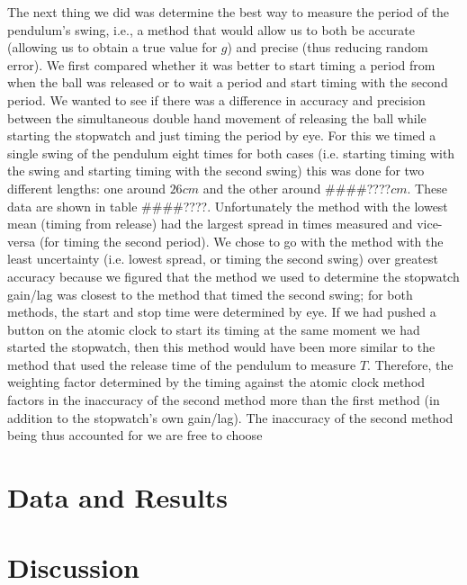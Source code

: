 \documentclass[iop]{emulateapj}
\def\g{$g$}
\def\T{$T$}
\def\fillin{\#\#\#\#????}
\begin{document}
The next thing we did was determine the best way to measure the period of the 
pendulum's swing, i.e., a method that would allow us to both be accurate 
(allowing us to obtain a true value for \g) and precise (thus reducing random 
error). We first compared whether it was better to start timing a period from 
when the ball was released or to wait a period and start timing with the 
second period.  We wanted to see if there was a difference in accuracy and 
precision between the simultaneous double hand movement of releasing the ball 
while starting the stopwatch and just timing the period by eye. For this we 
timed a single swing of the pendulum eight times for both cases (i.e. starting 
timing with the swing and starting timing with the second swing) this was done 
for two different lengths: one around $26cm$ and the other around \fillin$cm$. 
These data are shown in table \fillin. Unfortunately the method with the lowest 
mean (timing from release) had the largest spread in times measured and 
vice-versa (for timing the second period). We chose to go 
with the method with the least uncertainty (i.e. lowest spread, or timing the 
second swing) over greatest accuracy because we figured that the method we 
used to determine the stopwatch gain/lag was closest to the method that timed 
the second swing; for both methods, the start and stop time were determined by 
eye.  If we had pushed a button on the atomic clock to start its timing at the 
same moment we had started the stopwatch, then this method would have been 
more similar to the method that used the release time of the pendulum to 
measure \T.  Therefore, the weighting factor determined by the timing against 
the atomic clock method factors in the inaccuracy of the second method more 
than the first method (in addition to the stopwatch's own gain/lag). The 
inaccuracy of the second method being thus accounted for we are free to choose 






\section{Data and Results}
\label{sec:data}













\section{Discussion}
\label{sec:discuss}
\end{document}
